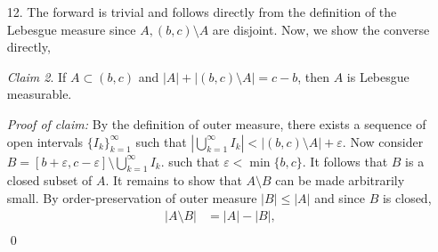 \documentclass{article}
\newcommand{\eps}{\varepsilon}
\theoremstyle{remark}
\newtheorem{claim}{Claim}
\newenvironment{poc}{\textit{Proof of claim:}}{\qed\\}
\begin{document}
\begin{enumerate}[leftmargin=*]
\begin{poc}
        By claim~\ref{claim:closed-bounded}, it follows that there exists a closed, bounded set $F \subset A$
        such that $|A \setminus F| < \eps$. Since $F$ is a Borel set, there must be a open cover $G \supset F$
        such that $|G \setminus F| < \eps$. $G$ is the union of finite disjoint open intervals $G_1, G_2,\ldots$,
        by the Heine-Borel theorem, there exists a finite subcover of $G' = \bigcup\{G_k\}_{k=1}^n$ of these open intervals. 
        Note that because $F$ is bounded and $|G\setminus F| < \eps$ each of these open intervals must also be bounded.
        Since $F\subset G' \subset G$, it must be that $|G' \setminus F| < \eps$. So,
        \begin{align*}
            |G' \Delta A| &= |G' \setminus A| + |A \setminus G'|, \\
            &\leq |G' \setminus F| + |A \setminus F|, \\
            &< 2\eps.
        \end{align*}
    \end{poc}
    Now, for the converse:
    \begin{claim}
        By the definition of outer measure, there exists a sequence of open intervals $\{I_k\}_{k=1}^\infty$ 
        such that $|\bigcup_{k=1}^\infty I_k| < |A\setminus G| + \eps$. Thus, it follows that $G\cup \bigcup_{k=1}^\infty I_k$
        is open and $|G\cup \bigcup_{k=1}^\infty I_k| < |A| + 2\eps$.  
    \end{claim}
    \item[12.] The forward is trivial and follows directly from the definition of the Lebesgue measure 
    since $A, (b,c) \setminus A$ are disjoint. Now, we show the converse directly,
    \begin{claim}
        If $A \subset (b,c)$ and $|A| + |(b,c) \setminus A| = c - b$, then $A$ is Lebesgue measurable.
    \end{claim}
    \begin{poc}
        By the definition of outer measure, there exists a sequence of open intervals $\{I_k\}_{k=1}^\infty$
        such that $|\bigcup_{k=1}^\infty I_k| < |(b,c)\setminus A| + \eps$. Now consider $B = [b+\eps,c-\eps] \setminus \bigcup_{k=1}^\infty I_k$.
        such that $\eps < \min\{b,c\}$. It follows that $B$ is a closed subset of $A$. It remains to show that $A \setminus B$ can
        be made arbitrarily small. By order-preservation of outer measure $|B| \leq |A|$ and since $B$ is closed, 
        \begin{align*}
            |A \setminus B| &= |A| - |B|, \\

\end{align*}
\end{poc}
\end{enumerate}
\end{document}
